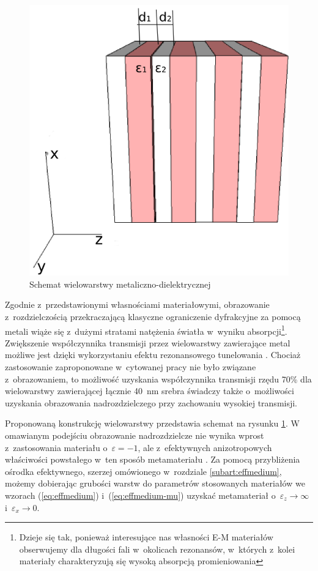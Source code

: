 \begin{figure}[htb]
	\centering
	\includegraphics[width=.5\textwidth]{images/multilayer/multilayer-3d.png}
	\caption{Schemat wielowarstwy metaliczno-dielektrycznej}
	\label{fig:mulschem}
\end{figure}

Zgodnie z~przedstawionymi własnościami materiałowymi, obrazowanie z~rozdzielczością przekraczającą klasyczne ograniczenie dyfrakcyjne za pomocą metali wiąże się z~dużymi stratami natężenia światła w~wyniku absorpcji\footnote{Dzieje się tak, ponieważ interesujące nas własności E-M materiałów obserwujemy dla długości fali w~okolicach rezonansów, w~których z~kolei materiały charakteryzują się wysoką absorpcją promieniowania}. Zwiększenie współczynnika transmisji przez wielowarstwy zawierające metal możliwe jest dzięki wykorzystaniu efektu rezonansowego tunelowania \cite{scalora-transparentmetal}. Chociaż zastosowanie zaproponowane w~cytowanej pracy nie było związane z~obrazowaniem, to możliwość uzyskania współczynnika transmisji rzędu 70\% dla wielowarstwy zawierającej łącznie 40~nm srebra świadczy także o~możliwości uzyskania obrazowania nadrozdzielczego przy zachowaniu wysokiej transmisji. 

Proponowaną konstrukcję wielowarstwy przedstawia schemat na rysunku \ref{fig:mulschem}. W omawianym podejściu obrazowanie nadrozdzielcze nie wynika wprost z~zastosowania materiału o~$\varepsilon = -1$, ale z~efektywnych anizotropowych właściwości powstałego w~ten sposób  metamateriału \cite{ramakrishna2003imaging}. Za pomocą przybliżenia ośrodka efektywnego, szerzej omówionego w~rozdziale \ref{subart:effmedium}, możemy dobierając grubości warstw do parametrów stosowanych materiałów we wzorach (\ref{eq:effmedium}) i~(\ref{eq:effmedium-mu})  uzyskać metamateriał o~$\varepsilon_z \to \infty$ i~$\varepsilon_x \to 0$.



